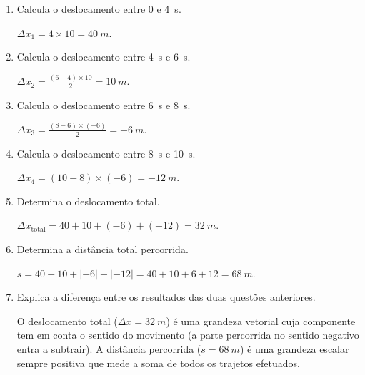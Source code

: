 \documentclass[11pt,a4paper]{article}
\begin{document}
	\begin{enumerate}[label=\textbf{\arabic*.},resume]
		
		\item Calcula o deslocamento entre $0$ e \SI{4}{s}.
		
		\begin{solucao}
			$\Delta x_1 = 4 \times 10 = \SI{40}{m}$.
		\end{solucao}
		
		\item Calcula o deslocamento entre \SI{4}{s} e \SI{6}{s}.
		
		\begin{solucao}
			$\Delta x_2 = \frac{(6 - 4) \times 10}{2} = \SI{10}{m}$.
		\end{solucao}
		
		\item Calcula o deslocamento entre \SI{6}{s} e \SI{8}{s}.
		
		\begin{solucao}
			$\Delta x_3 = \frac{(8 - 6) \times (-6)}{2} = \SI{-6}{m}$.
		\end{solucao}
		
		\item Calcula o deslocamento entre \SI{8}{s} e \SI{10}{s}.
		
		\begin{solucao}
			$\Delta x_4 = (10 - 8) \times (-6) = \SI{-12}{m}$.
		\end{solucao}
		
		\item Determina o deslocamento total.
		
		\begin{solucao}
			$\Delta x_{\text{total}} = 40 + 10 + (-6) + (-12) = \SI{32}{m}$.
		\end{solucao}
		
		\item Determina a distância total percorrida.
		
		\begin{solucao}
			$s = 40 + 10 + |-6| + |-12| = 40 + 10 + 6 + 12 = \SI{68}{m}$.
		\end{solucao}
		
		\item Explica a diferença entre os resultados das duas questões anteriores.
		
		\begin{solucao}
			O deslocamento total ($\Delta x = \SI{32}{m}$) é uma grandeza vetorial cuja componente tem em conta o sentido do movimento (a parte percorrida no sentido negativo entra a subtrair). A distância percorrida ($s = \SI{68}{m}$) é uma grandeza escalar sempre positiva que mede a soma de todos os trajetos efetuados.
		\end{solucao}
		
	\end{enumerate}
	
\end{document}
